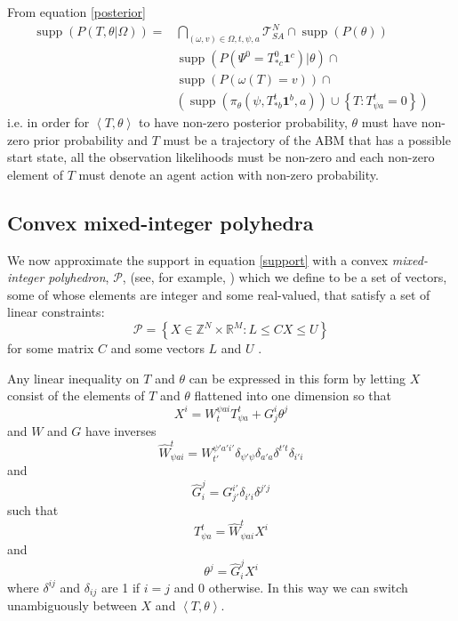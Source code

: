 \documentclass{article}
\DeclareMathOperator\supp{supp}
\begin{document}
From equation \eqref{posterior}
\begin{equation}
\begin{aligned}
\supp (P( T,\theta |\Omega)) = 
& \bigcap_{(\omega,v) \in \Omega,t, \psi, a} \mathcal{T}^N_{SA} \cap \supp(P(\theta)) \\ 
&\supp(P(\Psi^0 = T^0_{* c}\mathbf{1}^c)|\theta) \cap \\
& \supp\left(P\left(\omega(T)=v\right)\right) \cap \\
&\left( \supp\left(\pi_\theta(\psi,T^t_{* b}\mathbf{1}^b,a)\right) \cup \left\{T:T^t_{\psi a} = 0\right\} \right)
\end{aligned}
\label{support}
\end{equation}
i.e. in order for $\left<T,\theta\right>$ to have non-zero posterior probability, $\theta$ must have non-zero prior probability and $T$ must be a trajectory of the ABM that has a possible start state, all the observation likelihoods must be non-zero and each non-zero element of $T$ must denote an agent action with non-zero probability.

\subsection{Convex mixed-integer polyhedra}
\label{BPoly}

We now approximate the support in equation \ref{support} with a convex \textit{mixed-integer polyhedron}, $\mathcal{P}$, (see, for example, \citet{conforti2010polyhedral}) which we define to be a set of vectors, some of whose elements are integer and some real-valued, that satisfy a set of linear constraints:
\[
\mathcal{P} = \left\{ X\in\mathbb{Z}^N \times \mathbb{R}^M : L \le  CX \le U \right\}
\]
for some matrix $C$ and some vectors $L$ and $U$ .

Any linear inequality on $T$ and $\theta$ can be expressed in this form by letting $X$ consist of the elements of $T$ and $\theta$ flattened into one dimension so that
\[
X^i = W^{\psi a i}_{t}T^t_{\psi a} + G^i_j\theta^j
\]
and $W$ and $G$ have inverses
\[
\hat{W}^t_{\psi a i} = W^{\psi' a' i'}_{t'}\delta_{\psi'\psi}\delta_{a'a}\delta^{t't}\delta_{i'i}
\]
and
\[
\hat{G}^j_i = G^{i'}_{j'}\delta_{i'i}\delta^{j'j}
\]
such that
\[
T^t_{\psi a} = \hat{W}^{t}_{\psi a i}X^i
\]
and
\[
\theta^j = \hat{G}^{j}_{i} X^i
\]
where $\delta^{ij}$ and $\delta_{ij}$ are 1 if $i=j$ and 0 otherwise. In this way we can switch unambiguously between $X$ and $\left<T,\theta\right>$.
\end{document}

